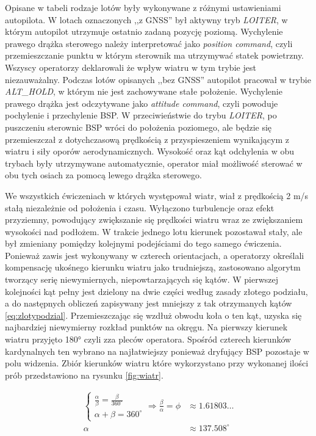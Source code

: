Opisane w tabeli rodzaje lotów były wykonywane z różnymi ustawieniami autopilota. W lotach oznaczonych ,,z GNSS'' był aktywny tryb \emph{LOITER}, w którym autopilot utrzymuje ostatnio zadaną pozycję poziomą. Wychylenie prawego drążka sterowego należy interpretować jako \emph{position command}, czyli przemieszczanie punktu w którym sterownik ma utrzymywać statek powietrzny. Wszyscy operatorzy deklarowali że wpływ wiatru w tym trybie jest niezauważalny. Podczas lotów opisanych ,,bez GNSS'' autopilot pracował w trybie \emph{ALT\_HOLD}, w którym nie jest zachowywane stałe położenie. Wychylenie prawego drążka jest odczytywane jako \emph{attitude command}, czyli powoduje pochylenie i przechylenie BSP. W przeciwieństwie do trybu \emph{LOITER}, po puszczeniu sterownic BSP wróci do położenia poziomego, ale będzie się przemieszczał z dotychczasową prędkością z przyspieszeniem wynikającym z wiatru i siły oporów aerodynamicznych. Wysokość oraz kąt odchylenia w obu trybach były utrzymywane automatycznie, operator miał możliwość sterować w obu tych osiach za pomocą lewego drążka sterowego.

We wszystkich ćwiczeniach w których występował wiatr, wiał z prędkością 2 m/s stałą niezależnie od położenia i czasu. Wyłączono turbulencje oraz efekt przyziemny, powodujący zwiększanie się prędkości wiatru wraz ze zwiększaniem wysokości nad podłożem. W trakcie jednego lotu kierunek pozostawał stały, ale był zmieniany pomiędzy kolejnymi podejściami do tego samego ćwiczenia. Ponieważ zawis jest wykonywany w czterech orientacjach, a operatorzy określali kompensację ukośnego kierunku wiatru jako trudniejszą, zastosowano algorytm tworzący serię niewymiernych, niepowtarzających się kątów. W pierwszej kolejności kąt pełny jest dzielony na dwie części według zasady złotego podziału, a do następnych obliczeń zapisywany jest mniejszy z tak otrzymanych kątów \ref{eq:zlotypodzial}. Przemieszczając się wzdłuż obwodu koła o ten kąt, uzyska się najbardziej niewymierny rozkład punktów na okręgu\cite{ridley1982}. Na pierwszy kierunek wiatru przyjęto 180° czyli zza pleców operatora. Spośród czterech kierunków kardynalnych ten wybrano na najłatwiejszy ponieważ dryfujący BSP pozostaje w polu widzenia. Zbiór kierunków wiatru które wykorzystano przy wykonanej ilości prób przedstawiono na rysunku \ref{fig:wiatr}.

\begin{align}
    \label{eq:zlotypodzial}
    \begin{cases}
        \frac{\alpha}{\beta} = \frac{\beta}{360^{\circ}} \\
        \alpha + \beta = 360^{\circ}
    \end{cases} \Rightarrow \frac{\beta}{\alpha} = \phi &\approx 1.61803\dots
    \\
    \alpha &\approx 137.508^{\circ}
\end{align}

